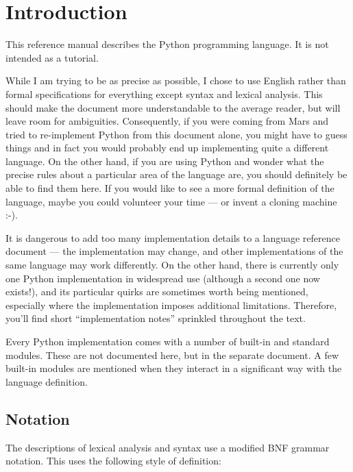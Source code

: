 \chapter{Introduction\label{introduction}}

This reference manual describes the Python programming language.
It is not intended as a tutorial.

While I am trying to be as precise as possible, I chose to use English
rather than formal specifications for everything except syntax and
lexical analysis.  This should make the document more understandable
to the average reader, but will leave room for ambiguities.
Consequently, if you were coming from Mars and tried to re-implement
Python from this document alone, you might have to guess things and in
fact you would probably end up implementing quite a different language.
On the other hand, if you are using
Python and wonder what the precise rules about a particular area of
the language are, you should definitely be able to find them here.
If you would like to see a more formal definition of the language,
maybe you could volunteer your time --- or invent a cloning machine
:-).

It is dangerous to add too many implementation details to a language
reference document --- the implementation may change, and other
implementations of the same language may work differently.  On the
other hand, there is currently only one Python implementation in
widespread use (although a second one now exists!), and
its particular quirks are sometimes worth being mentioned, especially
where the implementation imposes additional limitations.  Therefore,
you'll find short ``implementation notes'' sprinkled throughout the
text.

Every Python implementation comes with a number of built-in and
standard modules.  These are not documented here, but in the separate
 document.  A few
built-in modules are mentioned when they interact in a significant way
with the language definition.

\section{Notation\label{notation}}

The descriptions of lexical analysis and syntax use a modified BNF
grammar notation.  This uses the following style of definition:

